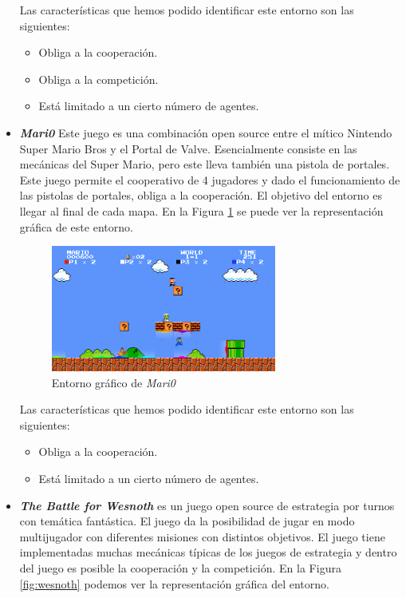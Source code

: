 \begin{itemize}
	      Las características que hemos podido identificar este entorno son las siguientes:
	      \begin{itemize}
		      \item Obliga a la cooperación.
		      \item Obliga a la competición.
		      \item Está limitado a un cierto número de agentes.
	      \end{itemize}

	\item \textbf{\textit{Mari0}} \cite{mari0} Este juego es una combinación open source entre el mítico Nintendo Super Mario Bros y el Portal de Valve. Esencialmente consiste en las mecánicas del Super Mario, pero este lleva también una pistola de portales. Este juego permite el cooperativo de 4 jugadores y dado el funcionamiento de las pistolas de portales, obliga a la cooperación. El objetivo del entorno es llegar al final de cada mapa. En la Figura \ref {fig:mari0} se puede ver la representación gráfica de este entorno.

	      \begin{figure}[ht]
		      \centering
		      \includegraphics[width=0.7\textwidth]{img/mari0-1.png}
		      \caption{Entorno gráfico de \textit{Mari0} \cite{mari0}}
		      \label{fig:mari0}
	      \end{figure}

	      Las características que hemos podido identificar este entorno son las siguientes:
	      \begin{itemize}
		      \item Obliga a la cooperación.
		      \item Está limitado a un cierto número de agentes.
	      \end{itemize}

	\item \textbf{\textit{The Battle for Wesnoth}} \cite{wesnoth} es un juego open source de estrategia por turnos con temática fantástica. El juego da la posibilidad de jugar en modo multijugador con diferentes misiones con distintos objetivos. El juego tiene implementadas muchas mecánicas típicas de los juegos de estrategia y dentro del juego es posible la cooperación y la competición. En la Figura \ref {fig:wesnoth} podemos ver la representación gráfica del entorno.


\end{itemize}
